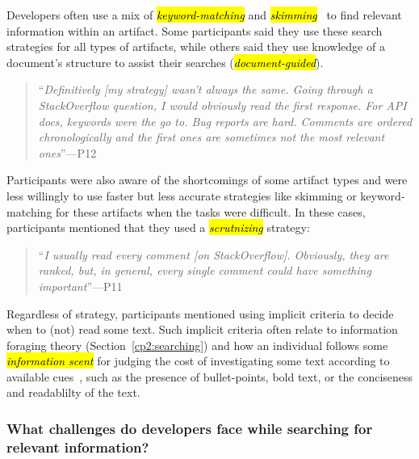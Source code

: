 Developers often use a mix of \hl{\textit{keyword-matching}} and \hl{\textit{skimming}}~\cite{Starke2009, Ko2006a} to find relevant information within an artifact. 
Some participants said they use these search strategies for all types of artifacts, while others said they use knowledge of a document's structure to assist their searches (\hl{\textit{document-guided}}).



\smallskip
\begin{quote}
    ``\textit{Definitively [my strategy] wasn't always the same. Going through a StackOverflow question, I would obviously read the first response. For API docs, keywords were the go to. Bug reports are hard. Comments are ordered chronologically and the first ones are sometimes not the most relevant ones}''---P12
\end{quote}


Participants were also aware of the shortcomings of some artifact types and were less willingly to use faster but less accurate strategies like skimming or keyword-matching for these artifacts when the tasks were difficult. 
In these cases, participants mentioned that they used a \hl{\textit{scrutnizing}} strategy:


\smallskip
\begin{quote}
    ``\textit{I usually read every comment [on StackOverflow]. Obviously, they are ranked, but, in general, every single comment could have something important}''---P11
\end{quote}
    


Regardless of strategy, participants mentioned using 
implicit criteria to decide when to (not) read some text.
Such implicit criteria often relate to information foraging theory (Section~\ref{cp2:searching}) and how an individual follows some
\hl{\textit{information scent}} for judging the cost of investigating some text according to available cues~\cite{Pirolli1999}, such as the presence of bullet-points, bold text, or the conciseness and readablilty of the text.



\subsubsection{What challenges do developers face while searching for relevant information?}
\label{cp3:search-challenges}


